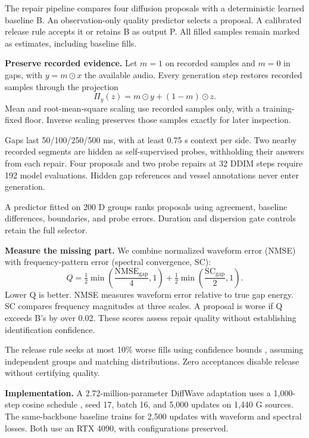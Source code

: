 \documentclass[runningheads,orivec]{llncs}
\begin{document}
The repair pipeline compares four diffusion proposals with a deterministic learned baseline B. An observation-only quality predictor selects a proposal. A calibrated release rule accepts it or retains B as output P. All filled samples remain marked as estimates, including baseline fills.

\textbf{Preserve recorded evidence.} Let $m=1$ on recorded samples and $m=0$ in gaps, with $y=m\odot x$ the available audio. Every generation step restores recorded samples through the projection
\begin{equation}
\Pi_y(z)=m\odot y+(1-m)\odot z.\label{eq:projection}
\end{equation}
Mean and root-mean-square scaling use recorded samples only, with a training-fixed floor. Inverse scaling preserves those samples exactly for later inspection.

Gaps last 50/100/250/500 ms, with at least 0.75 s context per side. Two nearby recorded segments are hidden as self-supervised probes, withholding their answers from each repair. Four proposals and two probe repairs at 32 DDIM steps \cite{ddim} require 192 model evaluations. Hidden gap references and vessel annotations never enter generation.

A predictor fitted on 200 D groups ranks proposals using agreement, baseline differences, boundaries, and probe errors. Duration and dispersion gate controls retain the full selector.

\textbf{Measure the missing part.} We combine normalized waveform error (NMSE) with frequency-pattern error (spectral convergence, SC):
\begin{equation}
Q=\tfrac12\min\!\left(\frac{\mathrm{NMSE}_{\mathrm{gap}}}{4},1\right)+\tfrac12\min\!\left(\frac{\mathrm{SC}_{\mathrm{gap}}}{2},1\right).\label{eq:quality}
\end{equation}
Lower Q is better. NMSE measures waveform error relative to true gap energy. SC compares frequency magnitudes at three scales. A proposal is worse if Q exceeds B's by over 0.02. These scores assess repair quality without establishing identification confidence.

The release rule seeks at most 10\% worse fills using confidence bounds \cite{ltt}, assuming independent groups and matching distributions. Zero acceptances disable release without certifying quality.

\textbf{Implementation.} A 2.72-million-parameter DiffWave adaptation uses a 1,000-step cosine schedule \cite{nichol}, seed 17, batch 16, and 5,000 updates on 1,440 G sources. The same-backbone baseline trains for 2,500 updates with waveform and spectral losses. Both use an RTX 4090, with configurations preserved.
\end{document}
